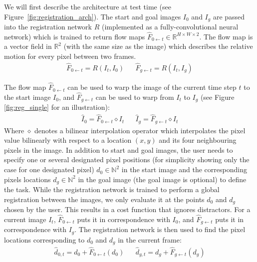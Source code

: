 We will first describe the architecture at test time (see Figure~\ref{fig:registration_arch}). The start and goal images $I_0$ and $I_g$ are passed into the registration network $R$ (implemented as a fully-convolutional neural network) which is trained to return flow maps $\hat{F}_{0 \leftarrow t} \in \mathbb{R}^{H \times W \times 2}$. The flow map is a vector field in $\mathbb{R}^2$ (with the same size as the image) which describes the relative motion for every pixel between two frames.
\begin{align}
    \hat{F}_{0 \leftarrow t} = R(I_t, I_0) &&
    \hat{F}_{g \leftarrow t} = R(I_t, I_g)
\end{align}

The flow map $\hat{F}_{0 \leftarrow t}$ can be used to warp the image of the current time step $t$ to the start image $I_0$, and $\hat{F}_{g \leftarrow t}$ can be used to warp from $I_t$ to $I_g$ (see Figure \ref{fig:reg_single} for an illustration):
\begin{align}
    \hat{I}_0 = \hat{F}_{0 \leftarrow t} \diamond  I_t &&
    \hat{I}_g = \hat{F}_{g \leftarrow t} \diamond  I_t 
\end{align}
Where $\diamond$ denotes a bilinear interpolation operator which interpolates the pixel value bilinearly with respect to a location $(x,y)$ and its four neighbouring pixels in the image.
In addition to start and goal images, the user needs to specify one or several designated pixel positions (for simplicity showing only the case for one designated pixel) $d_0 \in \mathbb{N}^2$ in the start image and the corresponding pixels locations $d_g \in \mathbb{N}^2$ in the goal image (the goal image is optional) to define the task. While the registration network is trained to perform a global registration between the images, we only evaluate it at the points $d_0$ and $d_g$ chosen by the user. This results in a cost function that ignores distractors. For a current image $I_t$, $\hat{F}_{0 \leftarrow t}$ puts it in correspondence with $I_0$, and $\hat{F}_{g \leftarrow t}$ puts it in correspondence with $I_g$. The registration network is then used to find the pixel locations corresponding to $d_0$ and $d_g$ in the current frame: 
\begin{align}
    \hat{d}_{0,t} = d_0 + \hat{F}_{0 \leftarrow t}(d_0) &&
    \hat{d}_{g,t} = d_g + \hat{F}_{g \leftarrow t}(d_g)
    \label{eqn:warped_pos}
\end{align}

